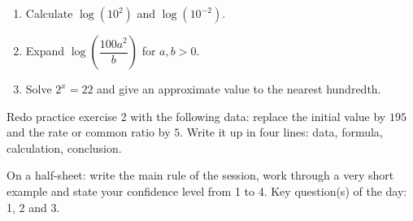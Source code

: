 \begin{exercice}[-- essentiel]
\begin{enumerate}\item Calculate $\log(10^2)$ and $\log(10^{-2})$.\item Expand $\log\!\left(\dfrac{100a^2}{b}\right)$ for $a,b>0$.\item Solve $2^x=22$ and give an approximate value to the nearest hundredth.\end{enumerate}
\end{exercice}


\begin{dm}Redo practice exercise 2 with the following data: replace the initial value by $195$ and the rate or common ratio by $5$. Write it up in four lines: data, formula, calculation, conclusion.\end{dm}

\begin{sortie}On a half-sheet: write the main rule of the session, work through a very short example and state your confidence level from 1 to 4. Key question(s) of the day: 1, 2 and 3.\end{sortie}

